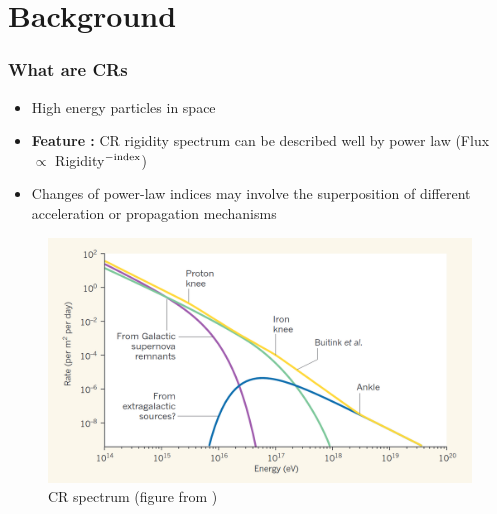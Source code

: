 \documentclass{beamer}
\begin{document}


\section{Background}
\begin{frame}
\frametitle{What are CRs}
\begin{itemize}
  \item High energy particles in space
  \item \textbf{Feature :} CR rigidity spectrum can be
  described well by power law (Flux $\propto$ Rigidity$^{\rm -index}$)
  \item Changes of power-law indices 
  may involve the superposition of different acceleration or propagation mechanisms
\end{itemize}
\end{frame}
\begin{frame}
  \begin{figure}
  \includegraphics[width=\textwidth]{figure/andrew_superposition.png}
  \caption{
    CR spectrum
    (figure from \cite{taylor2016_crspectrumsuperposition})
  }
  \end{figure}
\end{frame}
\end{document}
